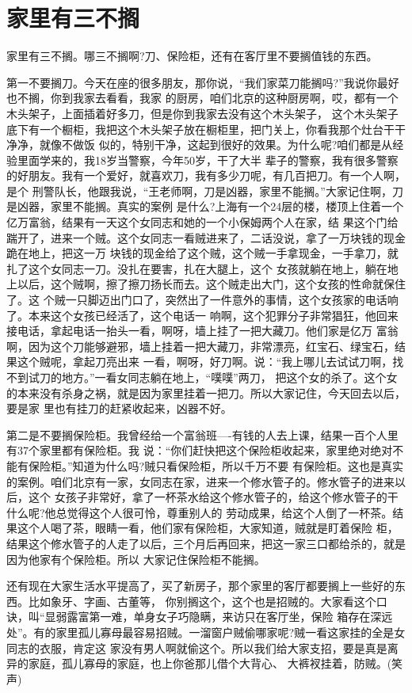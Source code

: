 \documentclass[11pt,a4paper,onecolumn]{article}
\begin{document}
\section{家里有三不搁}

家里有三不搁。哪三不搁啊?刀、保险柜，还有在客厅里不要搁值钱的东西。

第一不要搁刀。今天在座的很多朋友，那你说，``我们家菜刀能搁吗?''我说你最好也不搁，你到我家去看看，我家
的厨房，咱们北京的这种厨房啊，哎，都有一个木头架子，上面插着好多刀，但是你到我家去没有这个木头架子，
这个木头架子底下有一个橱柜，我把这个木头架子放在橱柜里，把门关上，你看我那个灶台干干净净，就像不做饭
似的，特别干净，这起到很好的效果。为什么呢?咱们都是从经验里面学来的，我18岁当警察，今年50岁，干了大半
辈子的警察，我有很多警察的好朋友。我有一个爱好，就喜欢刀，我有多少刀呢，有几百把刀。有一个人啊，是个
刑警队长，他跟我说，``王老师啊，刀是凶器，家里不能搁。''大家记住啊，刀是凶器，家里不能搁。真实的案例
是什么?上海有一个24层的楼，楼顶上住着一个亿万富翁，结果有一天这个女同志和她的一个小保姆两个人在家，结
果这个门给踹开了，进来一个贼。这个女同志一看贼进来了，二话没说，拿了一万块钱的现金跪在地上，把这一万
块钱的现金给了这个贼，这个贼一手拿现金，一手拿刀，就扎了这个女同志一刀。没扎在要害，扎在大腿上，这个
女孩就躺在地上，躺在地上以后，这个贼啊，擦了擦刀扬长而去。这个贼走出大门，这个女孩的性命就保住了。这
个贼一只脚迈出门口了，突然出了一件意外的事情，这个女孩家的电话响了。本来这个女孩已经活了，这个电话一
响啊，这个犯罪分子非常猖狂，他回来接电话，拿起电话一抬头一看，啊呀，墙上挂了一把大藏刀。他们家是亿万
富翁啊，因为这个刀能够避邪，墙上挂着一把大藏刀，非常漂亮，红宝石、绿宝石，结果这个贼呢，拿起刀亮出来
一看，啊呀，好刀啊。说：``我上哪儿去试试刀啊，找不到试刀的地方。''一看女同志躺在地上，``噗噗''两刀，
把这个女的杀了。这个女的本来没有杀身之祸，就是因为家里挂着一把刀。所以大家记住，今天回去以后，要是家
里也有挂刀的赶紧收起来，凶器不好。

第二是不要搁保险柜。我曾经给一个富翁班----有钱的人去上课，结果一百个人里有37个家里都有保险柜。我
说：``你们赶快把这个保险柜收起来，家里绝对绝对不能有保险柜。''知道为什么吗?贼只看保险柜，所以千万不要
有保险柜。这也是真实的案例。咱们北京有一家，女同志在家，进来一个修水管子的。修水管子的进来以后，这个
女孩子非常好，拿了一杯茶水给这个修水管子的，给这个修水管子的干什么呢?他总觉得这个人很可怜，尊重别人的
劳动成果，给这个人倒了一杯茶。结果这个人喝了茶，眼睛一看，他们家有保险柜，大家知道，贼就是盯着保险
柜，结果这个修水管子的人走了以后，三个月后再回来，把这一家三口都给杀的，就是因为他家有个保险柜。所以
大家记住保险柜不能搁。

还有现在大家生活水平提高了，买了新房子，那个家里的客厅都要搁上一些好的东西。比如象牙、字画、古董等，
你别搁这个，这个也是招贼的。大家看这个口诀，叫``显弱露富第一难，单身女子巧隐瞒，来访只在客厅坐，保险
箱存在深远处''。有的家里孤儿寡母最容易招贼。一溜窗户贼偷哪家呢?贼一看这家挂的全是女同志的衣服，肯定这
家没有男人啊就偷这个。所以我们给大家支招，要是真是离异的家庭，孤儿寡母的家庭，也上你爸那儿借个大背心、
大裤衩挂着，防贼。(笑声)
\end{document}
